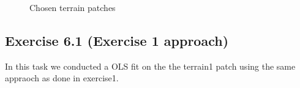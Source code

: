 \documentclass[11pt, a4paper]{article}
\begin{document}
\begin{figure}
  \centering
  \caption{Chosen terrain patches}%
  \label{fig:terrain_patches_focus}%
\end{figure}


\subsection*{Exercise 6.1 (Exercise 1 approach)}
In this task we conducted a OLS fit on the the terrain1 patch using the same appraoch as done in exercise1.
\end{document}
